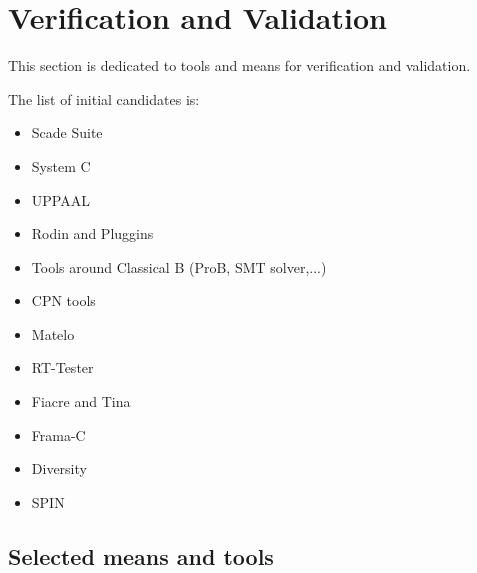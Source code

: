 

\chapter{Verification and Validation}
\label{sec:VnV}

This section is dedicated to tools and means for verification and validation.



The list of initial candidates is:

\begin{itemize}
\item Scade Suite
\item System C
\item UPPAAL
\item Rodin and Pluggins
\item Tools around Classical B (ProB, SMT solver,...)
\item CPN tools
\item Matelo
\item RT-Tester
\item Fiacre and Tina
\item Frama-C
\item Diversity
\item SPIN
\end{itemize}


\section{Selected means and tools}

\begin{comment}
To complete after decision meeting with a section for each tool with the following contents:

\begin{itemize}
\item description of the means or tools, references and links
\item added value for openETCS
\item for which tasks and how (input/output/actions) is the mean or tools used.
\end{itemize}
\end{comment}